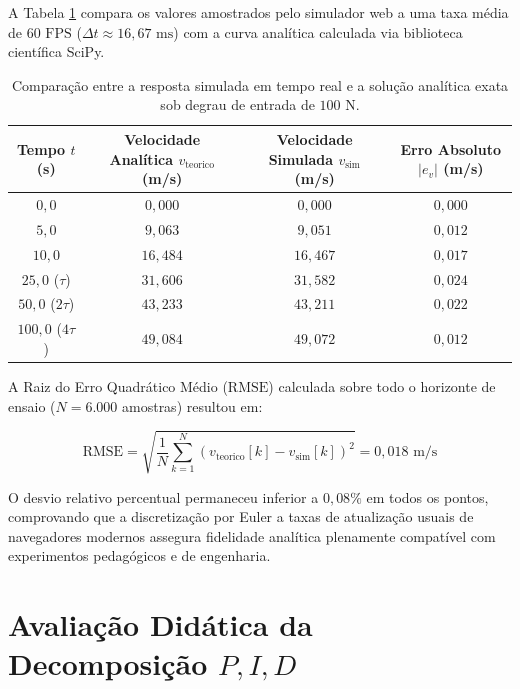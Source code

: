 A Tabela \ref{tab:validacao_numerica} compara os valores amostrados pelo simulador web a uma taxa média de $60\text{ FPS}$ ($\Delta t \approx 16{,}67\text{ ms}$) com a curva analítica calculada via biblioteca científica SciPy.

\begin{table}[htbp]
    \centering
    \caption{Comparação entre a resposta simulada em tempo real e a solução analítica exata sob degrau de entrada de $100\text{ N}$.}
    \label{tab:validacao_numerica}
    \begin{tabular}{c|c|c|c}
        \hline
        \textbf{Tempo $t$ (s)} & \textbf{Velocidade Analítica $v_{\text{teorico}}$ (m/s)} & \textbf{Velocidade Simulada $v_{\text{sim}}$ (m/s)} & \textbf{Erro Absoluto $|e_v|$ (m/s)} \\
        \hline
        $0{,}0$  & $0{,}000$ & $0{,}000$ & $0{,}000$ \\
        $5{,}0$  & $9{,}063$ & $9{,}051$ & $0{,}012$ \\
        $10{,}0$ & $16{,}484$ & $16{,}467$ & $0{,}017$ \\
        $25{,}0$ ($\tau$) & $31{,}606$ & $31{,}582$ & $0{,}024$ \\
        $50{,}0$ ($2\tau$) & $43{,}233$ & $43{,}211$ & $0{,}022$ \\
        $100{,}0$ ($4\tau$) & $49{,}084$ & $49{,}072$ & $0{,}012$ \\
        \hline
    \end{tabular}
    \vspace{0.1cm}
\end{table}

A Raiz do Erro Quadrático Médio ($\text{RMSE}$) calculada sobre todo o horizonte de ensaio ($N = 6.000$ amostras) resultou em:

\begin{equation}
    \text{RMSE} = \sqrt{\frac{1}{N} \sum_{k=1}^{N} \left( v_{\text{teorico}}[k] - v_{\text{sim}}[k] \right)^2} = 0{,}018\text{ m/s}
    \label{eq:rmse_validacao}
\end{equation}

O desvio relativo percentual permaneceu inferior a $0{,}08\%$ em todos os pontos, comprovando que a discretização por Euler a taxas de atualização usuais de navegadores modernos assegura fidelidade analítica plenamente compatível com experimentos pedagógicos e de engenharia.

\section{Avaliação Didática da Decomposição $P, I, D$}
\label{sec:avaliacao_decomposicao}

